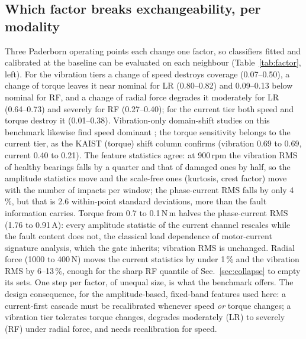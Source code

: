 \documentclass{ifacconf}
\begin{document}


\subsection{Which factor breaks exchangeability, per modality}
Three Paderborn operating points each change one factor, so classifiers fitted and calibrated at the baseline can be evaluated on each neighbour (Table~\ref{tab:factor}, left). For the vibration tiers a change of speed destroys coverage (0.07--0.50), a change of torque leaves it near nominal for LR (0.80--0.82) and 0.09--0.13 below nominal for RF, and a change of radial force degrades it moderately for LR (0.64--0.73) and severely for RF (0.27--0.40); for the current tier both speed and torque destroy it (0.01--0.38). Vibration-only domain-shift studies on this benchmark likewise find speed dominant \citep{panic2027baselines}; the torque sensitivity belongs to the current tier, as the KAIST (torque) shift column confirms (vibration 0.69 to 0.69, current 0.40 to 0.21). The feature statistics agree: at 900\,rpm the vibration RMS of healthy bearings falls by a quarter and that of damaged ones by half, so the amplitude statistics move and the scale-free ones (kurtosis, crest factor) move with the number of impacts per window; the phase-current RMS falls by only 4\,\%, but that is 2.6 within-point standard deviations, more than the fault information carries. Torque from 0.7 to 0.1\,N\,m halves the phase-current RMS (1.76 to 0.91\,A): every amplitude statistic of the current channel rescales while the fault content does not, the classical load dependence of motor-current signature analysis, which the gate inherits; vibration RMS is unchanged. Radial force (1000 to 400\,N) moves the current statistics by under 1\,\% and the vibration RMS by 6--13\,\%, enough for the sharp RF quantile of Sec.~\ref{sec:collapse} to empty its sets. One step per factor, of unequal size, is what the benchmark offers. The design consequence, for the amplitude-based, fixed-band features used here: a current-first cascade must be recalibrated whenever speed \emph{or} torque changes; a vibration tier tolerates torque changes, degrades moderately (LR) to severely (RF) under radial force, and needs recalibration for speed.
\end{document}
